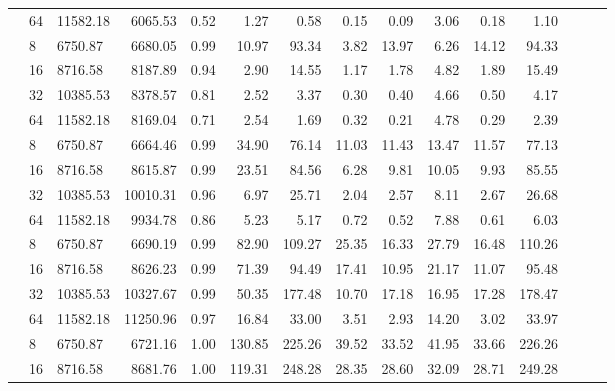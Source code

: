 \begin{table}
{\begin{tabular}{lllrrrrrrrrrrrr}
                            & 64 & 11582.18 & 6065.53   & 0.52   & 1.27   & 0.58   & 0.15  & 0.09  & 3.06  & 0.18  & 1.10    \\
                    \addlinespace
                    48      & 8  & 6750.87  & 6680.05   & 0.99   & 10.97  & 93.34  & 3.82  & 13.97 & 6.26  & 14.12 & 94.33   \\
                            & 16 & 8716.58  & 8187.89   & 0.94   & 2.90   & 14.55  & 1.17  & 1.78  & 4.82  & 1.89  & 15.49   \\
                            & 32 & 10385.53 & 8378.57   & 0.81   & 2.52   & 3.37   & 0.30  & 0.40  & 4.66  & 0.50  & 4.17    \\
                            & 64 & 11582.18 & 8169.04   & 0.71   & 2.54   & 1.69   & 0.32  & 0.21  & 4.78  & 0.29  & 2.39    \\
                    \addlinespace
                    96      & 8  & 6750.87  & 6664.46   & 0.99   & 34.90  & 76.14  & 11.03 & 11.43 & 13.47 & 11.57 & 77.13   \\
                            & 16 & 8716.58  & 8615.87   & 0.99   & 23.51  & 84.56  & 6.28  & 9.81  & 10.05 & 9.93  & 85.55   \\
                            & 32 & 10385.53 & 10010.31  & 0.96   & 6.97   & 25.71  & 2.04  & 2.57  & 8.11  & 2.67  & 26.68   \\
                            & 64 & 11582.18 & 9934.78   & 0.86   & 5.23   & 5.17   & 0.72  & 0.52  & 7.88  & 0.61  & 6.03    \\
                    \addlinespace
                    192     & 8  & 6750.87  & 6690.19   & 0.99   & 82.90  & 109.27 & 25.35 & 16.33 & 27.79 & 16.48 & 110.26  \\
                            & 16 & 8716.58  & 8626.23   & 0.99   & 71.39  & 94.49  & 17.41 & 10.95 & 21.17 & 11.07 & 95.48   \\
                            & 32 & 10385.53 & 10327.67  & 0.99   & 50.35  & 177.48 & 10.70 & 17.18 & 16.95 & 17.28 & 178.47  \\
                            & 64 & 11582.18 & 11250.96  & 0.97   & 16.84  & 33.00  & 3.51  & 2.93  & 14.20 & 3.02  & 33.97   \\
                    \addlinespace
                    288     & 8  & 6750.87  & 6721.16   & 1.00   & 130.85 & 225.26 & 39.52 & 33.52 & 41.95 & 33.66 & 226.26  \\
                            & 16 & 8716.58  & 8681.76   & 1.00   & 119.31 & 248.28 & 28.35 & 28.60 & 32.09 & 28.71 & 249.28  \\

\end{tabular}}
\end{table}
